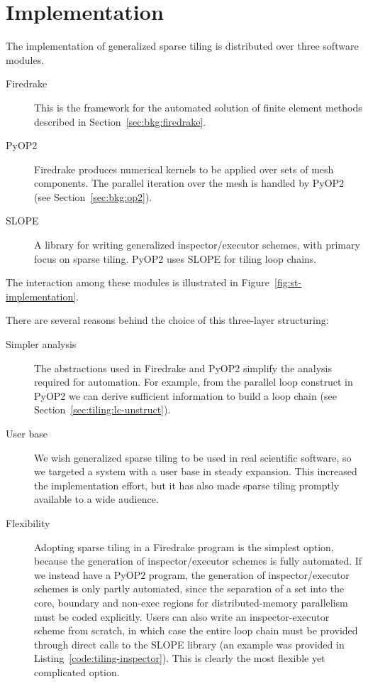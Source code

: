 
\section{Implementation}
\label{sec:tiling:automation}
The implementation of generalized sparse tiling is distributed over three software modules. 
\begin{description}
\item[Firedrake] This is the framework for the automated solution of finite element methods described in Section~\ref{sec:bkg:firedrake}. 
\item[PyOP2] Firedrake produces numerical kernels to be applied over sets of mesh components. The parallel iteration over the mesh is handled by PyOP2 (see Section~\ref{sec:bkg:op2}).
\item[SLOPE] A library for writing generalized inspector/executor schemes, with primary focus on sparse tiling. PyOP2 uses SLOPE for tiling loop chains.
\end{description}
The interaction among these modules is illustrated in Figure~\ref{fig:st-implementation}.

There are several reasons behind the choice of this three-layer structuring:
\begin{description}
\item[Simpler analysis] The abstractions used in Firedrake and PyOP2 simplify the analysis required for automation. For example, from the parallel loop construct in PyOP2 we can derive sufficient information to build a loop chain (see Section~\ref{sec:tiling:lc-unstruct}).
\item[User base] We wish generalized sparse tiling to be used in real scientific software, so we targeted a system with a user base in steady expansion. This increased the implementation effort, but it has also made sparse tiling promptly available to a wide audience.
\item[Flexibility] Adopting sparse tiling in a Firedrake program is the simplest option, because the generation of inspector/executor schemes is fully automated. If we instead have a PyOP2 program, the generation of inspector/executor schemes is only partly automated, since the separation of a set into the core, boundary and non-exec regions for distributed-memory parallelism must be coded explicitly. Users can also write an inspector-executor scheme from scratch, in which case the entire loop chain must be provided through direct calls to the SLOPE library (an example was provided in Listing~\ref{code:tiling-inspector}). This is clearly the most flexible yet complicated option. 
\end{description}


